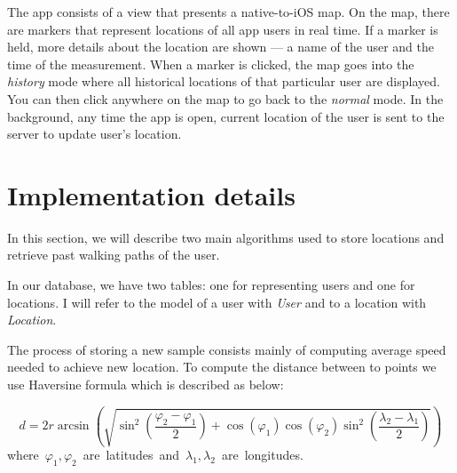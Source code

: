 The app consists of a view that presents a native-to-iOS map. On the map, there are markers that represent locations of all app users in real time. If a marker is held, more details about the location are shown --- a name of the user and the time of the measurement. When a marker is clicked, the map goes into the \textit{history} mode where all historical locations of that particular user are displayed. You can then click anywhere on the map to go back to the \textit{normal} mode. In the background, any time the app is open, current location of the user is sent to the server to update user's location.

\section{Implementation details}
In this section, we will describe two main algorithms used to store locations and retrieve past walking paths of the user.

In our database, we have two tables: one for representing users and one for locations. I will refer to the model of a user with \textit{User} and to a location with \textit{Location}.

The process of storing a new sample consists mainly of computing average speed needed to achieve new location. To compute the distance between to points we use Haversine formula which is described as below:

\begin{equation}
    \displaystyle d=2r\arcsin \left({\sqrt {\sin ^{2}\left({\frac {\varphi _{2}-\varphi _{1}}{2}}\right)+\cos(\varphi _{1})\cos(\varphi _{2})\sin ^{2}\left({\frac {\lambda _{2}-\lambda _{1}}{2}}\right)}}\right)
\end{equation}
where~$\varphi _{1},\varphi _{2}$~are~latitudes~and~$\lambda _{1},\lambda _{2}$~are~longitudes.

